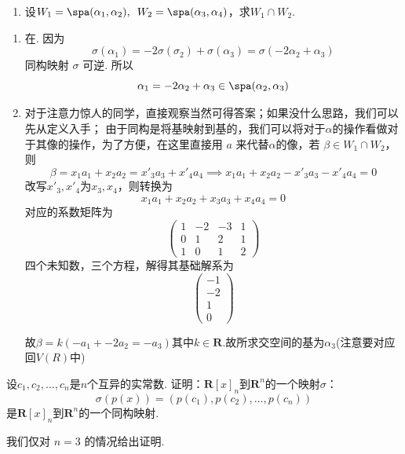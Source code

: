 \begin{exercise}
\begin{exgroup}
\begin{enumerate}
            \item 设$W_1=\spa(\alpha_1,\alpha_2),\enspace W_2=\spa(\alpha_3,\alpha_4)$，求$W_1\cap W_2$.
        \end{enumerate}

        \begin{answer}
            \begin{enumerate}
                \item 在. 因为
                      \[ \sigma(\alpha_1) = -2 \sigma(\sigma_2) + \sigma(\alpha_3) = \sigma(-2 \alpha_2 + \alpha_3) \]
                      同构映射 $ \sigma $ 可逆. 所以
                      \[ \alpha_1 = -2 \alpha_2 + \alpha_3 \in \spa(\alpha_2, \alpha_3) \]
                \item 对于注意力惊人的同学，直接观察当然可得答案；如果没什么思路，我们可以先从定义入手；
                由于同构是将基映射到基的，我们可以将对于$\alpha$的操作看做对于其像的操作，为了方便，在这里直接用 $a$ 来代替$\alpha$的像，若 $\beta \in W_1\cap W_2$，则
                \[ \beta = x_1 a_1+x_2 a_2=x'_3 a_3+x'_4 a_4 \implies  x_1 a_1+x_2 a_2-x'_3 a_3-x'_4 a_4 = 0 \]
                改写$x'_3,x'_4$为$x_3,x_4$，则转换为
                \[ x_1 a_1+x_2 a_2+x_3 a_3+x_4 a_4 = 0 \]
                对应的系数矩阵为
                \[ \begin{pmatrix}
                    1 & -2 & -3 & 1 \\
                    0 & 1 & 2 & 1\\
                    1 & 0 & 1 & 2
                \end{pmatrix} \]
                四个未知数，三个方程，解得其基础解系为
                \[ \begin{pmatrix}
                    -1 \\
                    -2 \\
                    1 \\
                    0
                \end{pmatrix} \]

                故$\beta = k(-a_1+-2a_2=-a_3)$其中$k\in \mathbf{R}$.故所求交空间的基为$\alpha_3$(注意要对应回$V(R)$中)
            \end{enumerate}
        \end{answer}

        \item 设$c_1,c_2,\ldots,c_n$是$n$个互异的实常数. 证明：$\mathbf{R}[x]_n$到$\mathbf{R}^n$的一个映射$\sigma$：
        \[\sigma(p(x))=(p(c_1),p(c_2),\ldots,p(c_n))\]
        是$\mathbf{R}[x]_n$到$\mathbf{R}^n$的一个同构映射.
        \begin{answer}
            我们仅对 $ n = 3 $ 的情况给出证明. %


\end{answer}
\end{exgroup}
\end{exercise}

